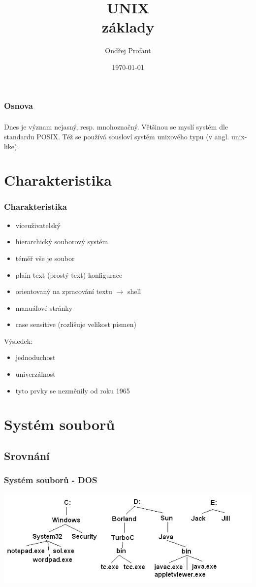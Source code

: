 \documentclass[xetex]{beamer}
\title{UNIX\\ základy}
\author{Ondřej Profant}
\institute[Piráti]{Knihovna Průhonice\\ Česká pirátská strana}
\date{\today}
\begin{document}
\begin{frame}
  \titlepage
\end{frame}

\begin{frame}
  \frametitle{Osnova}
  \tableofcontents
\end{frame}	

\begin{frame}
  \frametitle{}
  Dnes je význam nejasný, resp. mnohoznačný. 
  Většinou se myslí systém dle standardu POSIX. 
  Též se používá sousloví systém unixového typu (v angl. unix-like).
\end{frame}	

\section{Charakteristika}
\begin{frame}
  \frametitle{Charakteristika}
  \begin{itemize}
  \item víceuživatelský
  \item hierarchický souborový systém
  \item téměř vše je soubor
  \item plain text (prostý text) konfigurace
  \item orientovaný  na zpracování textu $\rightarrow$ shell
  \item manuálové stránky
  \item case sensitive (rozlišuje velikost písmen)
  \end{itemize}

Výsledek:
  \begin{itemize}
  \item jednoduchost
  \item univerzálnost
  \item tyto prvky se nezměnily od roku 1965
  \end{itemize}
\end{frame}	

\section{Systém souborů}
\subsection{Srovnání}
\begin{frame}
  \frametitle{Systém souborů - DOS}
  \includegraphics[scale=0.55]{pic/dosfs.png}
\end{frame}	
\end{document}
